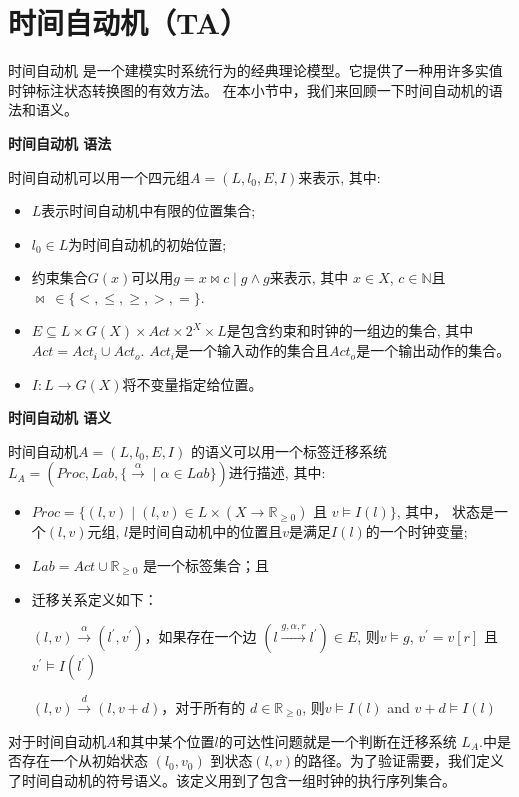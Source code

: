 \section{时间自动机（TA）}
时间自动机 \cite{BehrmannDLHPYH06}是一个建模实时系统行为的经典理论模型。它提供了一种用许多实值时钟标注状态转换图的有效方法。 在本小节中，我们来回顾一下时间自动机的语法和语义。
\begin{define}
\textbf{时间自动机 语法}

时间自动机可以用一个四元组$\textit{A}=(L,l_{0},E,I)$来表示, 其中:
\end{define}
\begin{itemize}
\item
$L$表示时间自动机中有限的位置集合;
\item
$l_{0} \in  L$为时间自动机的初始位置;
\item
约束集合$G(x)$可以用$g = x \bowtie c \mid g \land g$来表示, 其中 $x \in X$, $c \in \mathbb{N}$且$\bowtie~\in \{<,\leqslant,\geqslant,>,=\}$. 
\item
$E \subseteq L \times G(X) \times Act \times 2^X \times L$是包含约束和时钟的一组边的集合, 其中 $Act = Act_{i} \cup Act_{o}$. $Act_{i}$是一个输入动作的集合且$Act_{o}$是一个输出动作的集合。
\item
$I : L \rightarrow G(X)$将不变量指定给位置。
\end{itemize}
\begin{define}
\textbf{时间自动机 语义} 

时间自动机$\textit{A}=(L,l_{0},E,I)$ 的语义可以用一个标签迁移系统$L_{\textit{A}} = (Proc,Lab,\lbrace {{\xrightarrow{\alpha}}} \mid \alpha \in Lab \rbrace)$进行描述, 其中:
\end{define}
\begin{itemize}
\item 
$Proc = \lbrace(l,v) \mid (l,v) \in L \times (X \rightarrow \mathbb{R}_{\geqslant{0}})$ 且 $v \models I(l) \rbrace$, 其中， 状态是一个$(l,v)$元组, $l$是时间自动机中的位置且$v$是满足$I(l)$的一个时钟变量;
\item
$Lab = Act \cup \mathbb{R}_{\geqslant{0}}$ 是一个标签集合；且 
\item
迁移关系定义如下：

$(l,v) \xrightarrow{\alpha} (l^{\prime},v^{\prime})$，如果存在一个边 $(l \xrightarrow{g,\alpha,r} l^{\prime}) \in E$, 则$v \models g$, $v^{\prime} = v[r]$ 且 $v^{\prime} \models I(l^{\prime})$

$(l,v) \xrightarrow{d} (l,v+d)$，对于所有的 $d \in  \mathbb{R}_{\geqslant{0}}$, 则$v \models I(l)$ and $v + d \models I(l)$
\end{itemize}
对于时间自动机$A$和其中某个位置$l$的可达性问题就是一个判断在迁移系统 $L_{A}$.中是否存在一个从初始状态 $(l_{0},v_{0})$ 到状态$(l,v)$的路径。为了验证需要，我们定义了时间自动机的符号语义。该定义用到了包含一组时钟的执行序列集合。

